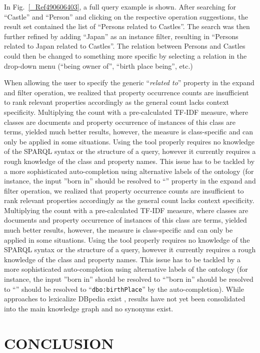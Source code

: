\documentclass{sig-alternate}
\begin{document}
In Fig.~\ref{_Ref490606403}, a full query example is shown. After searching for ``Castle'' and ``Person'' and clicking on the respective operation suggestions, the result set contained the list of ``Persons related to Castles''. The search was then further reﬁned by adding ``Japan'' as an instance ﬁlter, resulting in ``Persons related to Japan related to Castles''. The relation between Persons and Castles could then be changed to something more speciﬁc by selecting a relation in the drop-down menu (``being owner of'', ``birth place being'', etc.)

When allowing the user to specify the generic ``{\em related to}'' property in the expand and ﬁlter operation, we realized that property occurrence counts are insuﬃcient to rank relevant properties accordingly as the general count lacks context speciﬁcity. Multiplying the count with a pre-calculated TF-IDF measure, where classes are documents and property occurrence of instances of this class are terms, yielded much better results, however, the measure is class-speciﬁc and can only be applied in some situations. Using the tool properly requires no knowledge of the SPARQL syntax or the structure of a query, however it currently requires a rough knowledge of the class and property names. This issue has to be tackled by a more sophisticated auto-completion using alternative labels of the ontology (for instance, the input ''born in'' should be resolved to ``'' property in the expand and ﬁlter operation, we realized that property occurrence counts are insuﬃcient to rank relevant properties accordingly as the general count lacks context speciﬁcity. Multiplying the count with a pre-calculated TF-IDF measure, where classes are documents and property occurrence of instances of this class are terms, yielded much better results, however, the measure is class-speciﬁc and can only be applied in some situations. Using the tool properly requires no knowledge of the SPARQL syntax or the structure of a query, however it currently requires a rough knowledge of the class and property names. This issue has to be tackled by a more sophisticated auto-completion using alternative labels of the ontology (for instance, the input ''born in'' should be resolved to ``''born in'' should be resolved to ``'' should be resolved to ``\Verb+dbo:birthPlace+'' by the auto-completion). While approaches to lexicalize DBpedia exist  \cite{_Ref490639451}, results have not yet been consolidated into the main knowledge graph and no synonyms exist.

\section{CONCLUSION}
\end{document}
